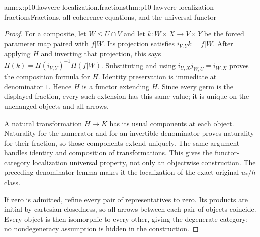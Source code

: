\begin{annexitem}{annex:p10.lawvere-localization.fractions}{thm:p10-lawvere-localization-fractions}{Fractions, all coherence equations, and the universal functor}
\begin{proof}
For a composite, let \(W\leq U\cap V\) and
let \(k:W\times X\to V\times Y\) be the
forced parameter map paired with \(f|W\).
Its projection satisfies \(i_{V,Y}k=f|W\).
After applying \(H\) and inverting that
projection, this says
\(H(k)=H(i_{V,Y})^{-1}H(f|W)\).
Substituting and using
\(i_{U,X}j_{W,U}=i_{W,X}\) proves the
composition formula for \(\bar H\).  Identity
preservation is immediate at denominator \(1\).
Hence \(\bar H\) is a functor extending \(H\).
Since every germ is the displayed fraction,
every such extension has this same value; it
is unique on the unchanged objects and all
arrows.

A natural transformation \(H\to K\) has
its usual components at each object.  Naturality
for the numerator and for an invertible denominator
proves naturality for their fraction, so those
components extend uniquely.  The same argument
handles identity and composition of transformations.
This gives the functor-category localization
universal property, not only an objectwise
construction.  The preceding denominator lemma
makes it the localization of the exact original
\(u_* / h\) class.

If zero is admitted, refine every pair of
representatives to zero.  Its products are
initial by cartesian closedness, so all arrows
between each pair of objects coincide.  Every
object is then isomorphic to every other,
giving the degenerate category; no nondegeneracy
assumption is hidden in the construction.
\end{proof}
\end{annexitem}


